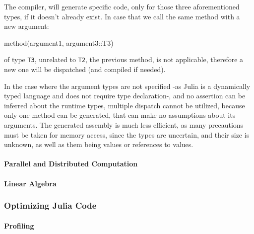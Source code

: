 \documentclass[]{article}
\newenvironment{Shaded}{}{}
\newcommand{\NormalTok}[1]{#1}
\let\oldparagraph\paragraph
\renewcommand{\paragraph}[1]{\oldparagraph{#1}\mbox{}}
\begin{document}
The compiler, will generate specific code, only for those three
aforementioned types, if it doesn't already exist. In case that we call
the same method with a new argument:

\begin{Shaded}
\begin{Highlighting}[]
\NormalTok{method(argument1, argument3::T3)}
\end{Highlighting}
\end{Shaded}

of type \texttt{T3}, unrelated to \texttt{T2}, the previous method, is
not applicable, therefore a new one will be dispatched (and compiled if
needed).

In the case where the argument types are not specified -as Julia is a
dynamically typed language and does not require type declaration-, and
no assertion can be inferred about the runtime types, multiple dispatch
cannot be utilized, because only one method can be generated, that can
make no assumptions about its arguments. The generated assembly is much
less efficient, as many precautions must be taken for memory access,
since the types are uncertain, and their size is unknown, as well as
them being values or references to values.

\paragraph{Parallel and Distributed
Computation}\label{parallel-and-distributed-computation}

\paragraph{Linear Algebra}\label{linear-algebra}

\subsubsection{Optimizing Julia Code}\label{optimizing-julia-code}

\paragraph{Profiling}\label{profiling}
\end{document}
